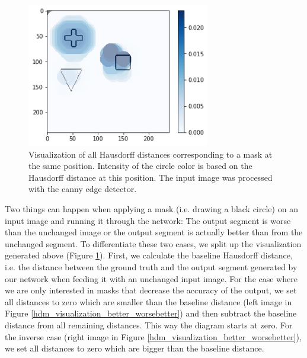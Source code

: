 \begin{figure}[H]
    \centering
    \includegraphics[width=8cm]{chapters/06_hdm/visualization/hdm_raw.png}
    \caption{Visualization of all Hausdorff distances corresponding to a mask at the same position. Intensity of the circle color is based on the Hausdorff distance at this position. The input image was processed with the canny edge detector.}
    \label{hdm_visualization_raw}
\end{figure}

Two things can happen when applying a mask (i.e. drawing a black circle) on an input image and running it through the network: The output segment is worse than the unchanged image or the output segment is actually better than from the unchanged segment. To differentiate these two cases, we split up the visualization generated above (Figure \ref{hdm_visualization_raw}). First, we calculate the baseline Hausdorff distance, i.e. the distance between the ground truth and the output segment generated by our network when feeding it with an unchanged input image. For the case where we are only interested in masks that decrease the accuracy of the output, we set all distances to zero which are smaller than the baseline distance (left image in Figure \ref{hdm_visualization_better_worsebetter}) and then subtract the baseline distance from all remaining distances. This way the diagram starts at zero. For the inverse case (right image in Figure \ref{hdm_visualization_better_worsebetter}), we set all distances to zero which are bigger than the baseline distance.

